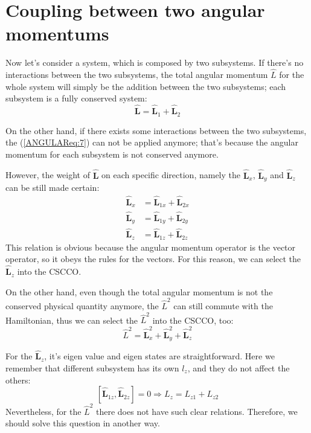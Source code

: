 \section{ Coupling between two angular momentums}
%
%
%
Now let's consider a system, which is composed by two subsystems. If
there's no interactions between the two subsystems, the total
angular momentum $\hat{L}$ for the whole system will simply be the
addition between the two subsystems; each subsystem is a fully
conserved system:
\begin{equation}\label{ANGULAReq:7}
\hat{\mathbf{L}} = \hat{\mathbf{L}}_{1} + \hat{\mathbf{L}}_{2}
\end{equation}

On the other hand, if there exists some interactions between the two
subsystems, the (\ref{ANGULAReq:7}) can not be applied anymore;
that's because the angular momentum for each subsystem is not
conserved anymore.

However, the weight of $\hat{\mathbf{L}}$ on each specific
direction, namely the $\hat{\mathbf{L}}_{x}$, $\hat{\mathbf{L}}_{y}$
and $\hat{\mathbf{L}}_{z}$ can be still made certain:
\begin{align}\label{}
\hat{\mathbf{L}}_{x} &= \hat{\mathbf{L}}_{1x} +
\hat{\mathbf{L}}_{2x} \nonumber \\
\hat{\mathbf{L}}_{y} &= \hat{\mathbf{L}}_{1y} +
\hat{\mathbf{L}}_{2y} \nonumber \\
\hat{\mathbf{L}}_{z} &= \hat{\mathbf{L}}_{1z} +
\hat{\mathbf{L}}_{2z}
\end{align}
This relation is obvious because the angular momentum operator is
the vector operator, so it obeys the rules for the vectors. For this
reason, we can select the $\hat{\mathbf{L}}_{z}$ into the CSCCO.

On the other hand, even though the total angular momentum is not the
conserved physical quantity anymore, the $\hat{L}^{2}$ can still
commute with the Hamiltonian, thus we can select the $\hat{L}^{2}$
into the CSCCO, too:
\begin{equation}\label{}
\hat{L}^{2} = \hat{\mathbf{L}}_{x}^{2} + \hat{\mathbf{L}}_{y}^{2} +
\hat{\mathbf{L}}_{z}^{2}
\end{equation}

For the $\hat{\mathbf{L}}_{z}$, it's eigen value and eigen states
are straightforward. Here we remember that different subsystem has
its own $l_{z}$, and they do not affect the others:
\begin{equation}\label{}
[\hat{\mathbf{L}}_{1z}, \hat{\mathbf{L}}_{2z}] = 0 \Rightarrow L_{z}
= L_{z1} + L_{z2}
\end{equation}
Nevertheless, for the $\hat{L}^{2}$ there does not have such clear
relations. Therefore, we should solve this question in another way.

